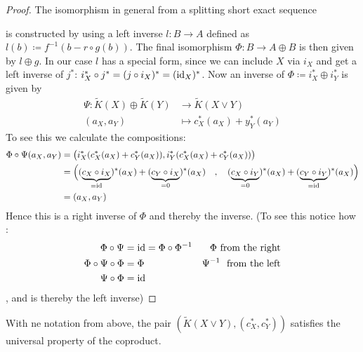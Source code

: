 \begin{proof}
	The isomorphism in general from a splitting short exact sequence 
	\begin{center}
	\end{center}is constructed by using a left inverse $l:B \to A$ defined as $l(b)\coloneq f^{-1}(b-r\circ g(b))$. The final isomorphism $\Phi: B\to A\oplus B$ is then given by $l\oplus g$. In our case $l$ has a special form, since we can include $X$ via $i_X$ and get a left inverse of $j^*$: $i_X^*\circ j^*=(j\circ i_X)^*=(\operatorname{\mathrm{id}}_X)^*$.
	Now an inverse of $\Phi\coloneq i_X^*\oplus i_Y^*$ is given by 
	\begin{align*}
		\Psi: \tilde{K}(X)\oplus \tilde{K}(Y) &\to \tilde{K}(X\vee Y)\\
		(a_X,a_Y)                             &\mapsto c_X^*(a_X)+y_Y^*(a_Y)
	\end{align*}
	To see this we calculate the compositions:
	\begin{align*}
		\Phi\circ \Psi(a_X,a_Y)&=\big( i_X^*(c_X^*(a_X)+c_Y^*(a_X)),i_Y^*(c_X^*(a_X)+c_Y^*(a_X)) \big)\\
		&=\Big( (\underbrace{c_X\circ i_X}_{=\operatorname{\mathrm{id}}})^*(a_X)+(\underbrace{c_Y\circ i_X}_{=0})^*(a_X)\quad , \quad (\underbrace{c_X\circ i_Y}_{=0})^*(a_X)+(\underbrace{c_Y\circ i_Y}_{=\operatorname{\mathrm{id}}})^*(a_X) \Big)\\
		&=(a_X,a_Y)
	\end{align*}
	Hence this is a right inverse of $\Phi$ and thereby the inverse. (To see this notice how :
	\begin{align*}
		\Phi\circ \Psi&=\operatorname{\mathrm{id}}=\Phi\circ \Phi^{-1} &\Phi ~\text{from the right}\\
		\Phi\circ \Psi\circ \Phi &=\Phi & \Psi^{-1}~ \text{ from the left}\\
		\Psi\circ \Phi &=\operatorname{\mathrm{id}}
	\end{align*}, and is thereby the left inverse)
\end{proof}
\begin{corollary}
	With ne notation from above, the pair $(\tilde{K}(X\vee Y),(c_X^*,c_Y^*))$ satisfies the universal property of the coproduct. 
\end{corollary}
